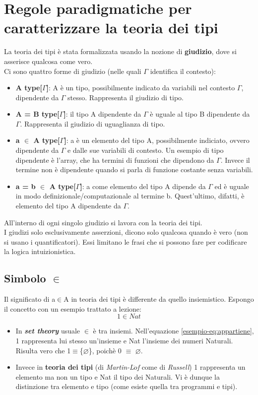 \documentclass[10pt,a4paper, italian]{book}
\begin{document}
\section{Regole paradigmatiche per caratterizzare la teoria dei tipi}
\label{sec:prime-regole-teoria-dei-tipi}
La teoria dei tipi \`e stata formalizzata usando la nozione di \textbf{giudizio}, dove si asserisce qualcosa come vero.\\
Ci sono quattro forme di giudizio (nelle quali $\Gamma$ identifica il contesto):
\begin{itemize}
\item \textbf{A type[$\Gamma$]}: A \`e un tipo, possibilmente indicato da variabili nel contesto $\Gamma$, dipendente da $\Gamma$ stesso. Rappresenta il giudizio di tipo.
\item \textbf{A = B type[$\Gamma$]}: il tipo A dipendente da $\Gamma$ \`e uguale al tipo B dipendente da $\Gamma$. Rappresenta il giudizio di uguaglianza di tipo.
\item \textbf{a $\in$ A type[$\Gamma$]}: a \`e un elemento del tipo A, possibilmente indiciato, ovvero dipendente da $\Gamma$ e dalle sue variabili di contesto. Un esempio di tipo dipendente \`e l'array, che ha termini di funzioni che dipendono da $\Gamma$. Invece il termine non \`e dipendente quando si parla di funzione costante senza variabili.
\item \textbf{a = b $\in$ A type[$\Gamma$]}: a come elemento del tipo A dipende da $\Gamma$ ed \`e uguale in modo definizionale/computazionale al termine b. Quest'ultimo, difatti, \`e elemento del tipo A dipendente da $\Gamma$.
\end{itemize}
\noindent
All'interno di ogni singolo giudizio si lavora con la teoria dei tipi.\\
I giudizi solo esclusivamente asserzioni, dicono solo qualcosa quando \`e vero (non si usano i quantificatori). Essi limitano le frasi che si possono fare per codificare la logica intuizionistica. 
\subsection{Simbolo $\in$}
\label{subsec:simbolo-appartiene}
Il significato di a$\in$A in teoria dei tipi \`e differente da quello insiemistico. Espongo il concetto con un esempio trattato a lezione:
\begin{equation}
1 \in Nat \label{esempio-eq:appartiene}
\end{equation}


\begin{itemize}
\item In \textbf{\textit{set theory}} usuale $\in$ \`e tra insiemi. Nell'equazione \ref{esempio-eq:appartiene}, 1 rappresenta lui stesso un'insieme e Nat l'insieme dei numeri Naturali.
Risulta vero che 1$\equiv$\{$\varnothing$\}, poich\`e 0 $\equiv$ $\varnothing$.
\item Invece in \textbf{teoria dei tipi} (di \textit{Martin-L$\ddot{o}$f} come di \textit{Russell})
1 rappresenta un elemento ma non un tipo e Nat il tipo dei Naturali. Vi \`e dunque la distinzione tra elemento e tipo (come esiste quella tra programmi e tipi).
\end{itemize}
\end{document}
